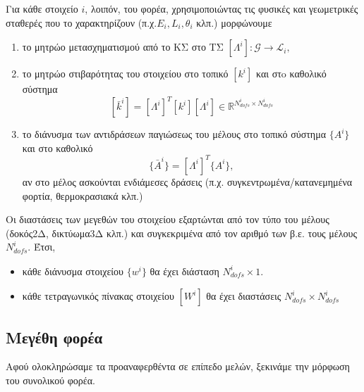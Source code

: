 \documentclass[a4paper, twocolumn]{article}
\newcommand{\num}[1]{ N_{\mathit{#1}} }
\newcommand{\gs}{\mathcal{G}}
\newcommand{\ls}{\mathcal{L}_i}
\newcommand{\vect}[1]{ \{ #1\} }
\newcommand{\mat}[1]{\left[ #1 \right]}
\newcommand{\gtol}{\mat{\Lambda^i}}
\newcommand{\lstiff}[1]{\mat{k^{\mathit{#1}}}}
\newcommand{\gstiff}[1]{\mat{\bar{k}^{\mathit{#1}}}}
\begin{document}
Για κάθε στοιχείο $i$, λοιπόν, του 
φορέα, χρησιμοποιώντας τις φυσικές και γεωμετρικές σταθερές που το 
χαρακτηρίζουν (π.χ.$E_i, L_i, \theta_i$ κλπ.) μορφώνουμε
\begin{enumerate}
	\item το μητρώο μετασχηματισμού από το ΚΣ στο ΤΣ
	$ \gtol: \gs \rightarrow \ls ,$
	\item το μητρώο στιβαρότητας του στοιχείου στο τοπικό 
	$\lstiff{i}$ και
 	στo καθολικό σύστημα
		\begin{equation}
			\gstiff i = \gtol^T \lstiff{i} \gtol \in 
			\mathbb{R}^{\num{dofs}^i \times \num{dofs}^i}
		\end{equation}

	\item το διάνυσμα των αντιδράσεων παγιώσεως του μέλους στο τοπικό 
	σύστημα $\vect{A^i} $ και στο καθολικό 
	\begin{equation}
		\vect{\bar A^i} = \gtol^T \vect{A^i},
	\end{equation}
	αν στο μέλος ασκούνται ενδιάμεσες δράσεις (π.χ. 
	συγκεντρωμένα/κατανεμημένα φορτία, θερμοκρασιακά κλπ.)

\end{enumerate}

Οι διαστάσεις των μεγεθών του στοιχείου 
εξαρτώνται από τον τύπο του 
μέλους (δοκός2Δ, δικτύωμα3Δ κλπ.) και συγκεκριμένα 
από τον αριθμό των β.ε. τους μέλους $\num{dofs}^i$. Έτσι, 
\begin{itemize}
	\item κάθε διάνυσμα στοιχείου $\vect{w^i}$ θα έχει διάσταση 
	$\num{dofs}^i \times 1$.
	\item κάθε τετραγωνικός πίνακας στοιχείου $\mat{W^i}$ θα έχει 
	διαστάσεις $\num{dofs}^i  \times \num{dofs}^i$
\end{itemize} 

\subsection{Μεγέθη φορέα}
Αφού ολοκληρώσαμε τα προαναφερθέντα σε επίπεδο μελών, ξεκινάμε την 
μόρφωση του συνολικού φορέα.
\end{document}
